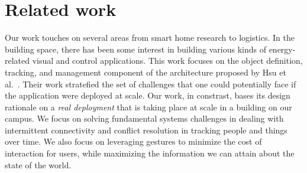 \section{Related work}

Our work touches on several areas from smart home research to logistics.  In the building space, there has been
some interest in building various kinds of energy-related visual and control applications.
This work focuses on the object definition, tracking, and management component of the architecture proposed by 
Hsu et al.~\cite{hbci}.  Their work stratefied the set of challenges that one could potentially face if the application 
were deployed at scale.  Our
work, in constrast, bases its design rationale on a \emph{real deployment} that is taking place at scale in a building 
on our campus.  We focus on solving fundamental systems challenges in dealing with intermittent connectivity
and conflict resolution in tracking people and things over time.  We also focus on leveraging gestures to minimize
the cost of interaction for users, while maximizing the information we can attain about the state of the world.

